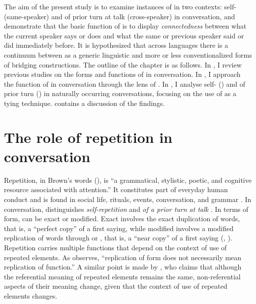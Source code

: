 \documentclass[output=paper]{LSP/langsci}
\begin{document}
The aim of the present study is to examine instances of  in two contexts: self- (same-speaker) and  of prior turn at talk (cross-speaker) in  conversation, and demonstrate that the basic function of  is to display \textit{connectedness} between what the current speaker says or does and what the same or previous speaker said or did immediately before. It is hypothesized that across languages there is a continuum between  as a generic linguistic  and more or less conventionalized forms of bridging constructions. The outline of the chapter is as follows. In , I review previous studies on the forms and functions of  in conversation. In , I approach the  function of  in conversation through the lens of . In , I analyse self- () and  of prior turn () in naturally occurring conversations, focusing on the use of  as a tying technique.  contains a discussion of the findings. 

\section{The role of repetition in conversation}
\label{Alrole.repetition}
Repetition, in Brown's words (\citeyear[][225]{brown.2000}), is ``a grammatical, stylistic, poetic, and cognitive resource associated with attention.'' It constitutes part of everyday human conduct and is found in social life, rituals, events, conversation, and grammar \citep{johnstone94,brown.2000, wong10}. In conversation,  distinguishes \textit{self-repetition} and \textit{ of a prior turn at talk} \citep{brown.2000}. In terms of form,  can be exact or modified. Exact  involves the exact duplication of words, that is, a ``perfect copy'' of a first saying, while modified  involves a modified replication of words through  or , that is, a ``near copy'' of a first saying (\citealt[][368]{couper96}, \citealt[][224]{brown.2000}). Repetition carries multiple functions that depend on the context of use of repeated elements. As \citet[][368]{couper96} observes, ``replication of form does not necessarily mean replication of function.'' A similar point is made by \citet[][12]{johnstone94}, who claims that although the referential meaning of repeated elements remains the same, non-referential aspects of their meaning change, given that the context of use of repeated elements changes. 
\end{document}
